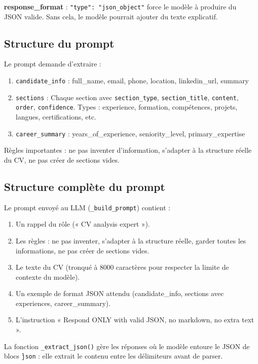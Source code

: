 \documentclass[11pt,a4paper]{report}
\begin{document}
\textbf{response\_format} : \texttt{"type": "json\_object"} force le modèle à produire du JSON valide. Sans cela, le modèle pourrait ajouter du texte explicatif.

\subsection{Structure du prompt}

Le prompt demande d'extraire :
\begin{enumerate}[leftmargin=*]
  \item \texttt{candidate\_info} : full\_name, email, phone, location, linkedin\_url, summary
  \item \texttt{sections} : Chaque section avec \texttt{section\_type}, \texttt{section\_title}, \texttt{content}, \texttt{order}, \texttt{confidence}. Types : experience, formation, compétences, projets, langues, certifications, etc.
  \item \texttt{career\_summary} : years\_of\_experience, seniority\_level, primary\_expertise
\end{enumerate}

Règles importantes : ne pas inventer d'information, s'adapter à la structure réelle du CV, ne pas créer de sections vides.

\subsection{Structure complète du prompt}

Le prompt envoyé au LLM (\texttt{\_build\_prompt}) contient :
\begin{enumerate}[leftmargin=*]
  \item Un rappel du rôle (« CV analysis expert »).
  \item Les règles : ne pas inventer, s'adapter à la structure réelle, garder toutes les informations, ne pas créer de sections vides.
  \item Le texte du CV (tronqué à 8000 caractères pour respecter la limite de contexte du modèle).
  \item Un exemple de format JSON attendu (candidate\_info, sections avec experiences, career\_summary).
  \item L'instruction « Respond ONLY with valid JSON, no markdown, no extra text ».
\end{enumerate}

La fonction \texttt{\_extract\_json()} gère les réponses où le modèle entoure le JSON de blocs \texttt{\`\`\`json} : elle extrait le contenu entre les délimiteurs avant de parser.
\end{document}
